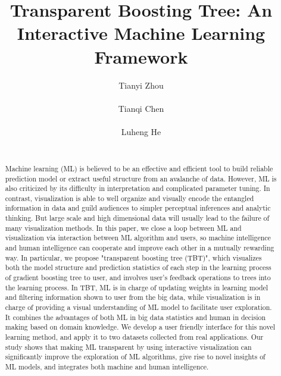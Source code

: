 \documentclass{chi2009}
\begin{document}
\setlength{\paperheight}{11in}
\setlength{\paperwidth}{8.5in}
\setlength{\pdfpageheight}{\paperheight}
\setlength{\pdfpagewidth}{\paperwidth}


\title{Transparent Boosting Tree: An Interactive Machine Learning Framework}
\author{
  \alignauthor Tianyi Zhou\\
    \\
  \alignauthor Tianqi Chen\\
    \\
  \alignauthor Luheng He\\
    \\
}

\maketitle

\begin{abstract}
        Machine learning (ML) is believed to be an effective and efficient tool to build reliable prediction model or extract useful structure from an avalanche of data. However, ML is also criticized by its difficulty in interpretation and complicated parameter tuning. In contrast, visualization is able to well organize and visually encode the entangled information in data and guild audiences to simpler perceptual inferences and analytic thinking. But large scale and high dimensional data will usually lead to the failure of many visualization methods. In this paper, we close a loop between ML and visualization via interaction between ML algorithm and users, so machine intelligence and human intelligence can cooperate and improve each other in a mutually rewarding way. In particular, we propose "transparent boosting tree (TBT)", which visualizes both the model structure and prediction statistics of each step in the learning process of gradient boosting tree to user, and involves user's feedback operations to trees into the learning process. In TBT, ML is in charge of updating weights in learning model and filtering information shown to user from the big data, while visualization is in charge of providing a visual understanding of ML model to facilitate user exploration. It combines the advantages of both ML in big data statistics and human in decision making based on domain knowledge. We develop a user friendly interface for this novel learning method, and apply it to two datasets collected from real applications. Our study shows that making ML transparent by using interactive visualization can significantly improve the exploration of ML algorithms, give rise to novel insights of ML models, and integrates both machine and human intelligence.  
\end{abstract}
\end{document}
